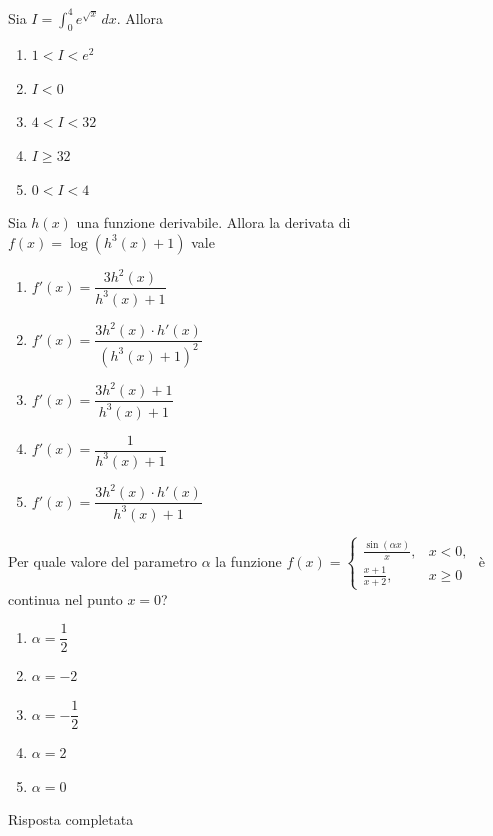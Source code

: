 \begin{quiz}
Sia $\displaystyle I=\int_0^4 e^{\sqrt{x}}\,dx$. Allora
\begin{enumerate}
\item $1<I<e^2$
\item $I<0$
\item $4<I<32$
\item $I\ge32$
\item $0<I<4$
\end{enumerate}
\end{quiz}

\begin{quiz}
Sia $h(x)$ una funzione derivabile. Allora la derivata di $f(x)=\log(h^3(x)+1)$ vale
\begin{enumerate}
\item $f\prime(x)=\dfrac{3h^2(x)}{h^3(x)+1}$
\item $f\prime(x)=\dfrac{3h^2(x)\cdot h\prime(x)}{(h^3(x)+1)^2}$
\item $f\prime(x)=\dfrac{3h^2(x)+1}{h^3(x)+1}$
\item $f\prime(x)=\dfrac1{h^3(x)+1}$
\item $f\prime(x)=\dfrac{3h^2(x)\cdot h\prime(x)}{h^3(x)+1}$
\end{enumerate}
\end{quiz}

\begin{quiz}
Per quale valore del parametro $\alpha$ la funzione $\displaystyle f(x)=\begin{cases}\frac{\sin(\alpha x)}x,&x<0,\\[2pt]\frac{x+1}{x+2},&x\ge0\end{cases}$ \`e continua nel punto $x=0$?
\begin{enumerate}
\item $\alpha=\dfrac12$
\item $\alpha=-2$
\item $\alpha=-\dfrac12$
\item $\alpha=2$
\item $\alpha=0$
\end{enumerate}
\end{quiz}

Risposta completata
